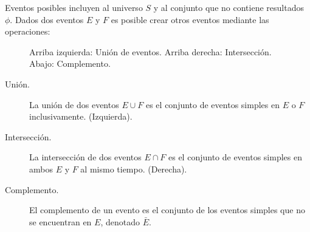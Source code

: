 Eventos posibles incluyen al universo $S$ y al conjunto que no contiene resultados $\phi$.  Dados dos eventos $E$ y $F$ es posible crear otros eventos mediante las operaciones:

\begin{figure}
  \centering
  \def\firstcircle{(0,0) circle (1.5cm)}
  \def\secondcircle{(0:2cm) circle (1.5cm)}
  \def\universesquare{(-2,-2) rectangle (4,2)}
  \def\universesmall{(-2,-2) rectangle (2,2)}
  
  \vspace{2mm}
  \caption{Arriba izquierda: Unión de eventos.  Arriba derecha: Intersección.  Abajo: Complemento.}\label{fig:creacionEventos}
\end{figure}

\begin{description}
 \item [Unión.] La unión de dos eventos $E \cup F$ es el conjunto de eventos simples en $E$ o $F$ inclusivamente.  (Izquierda).
 \item [Intersección.]  La intersección de dos eventos $E \cap F$ es el conjunto de eventos simples en ambos $E$ y $F$ al mismo tiempo.  (Derecha).
 \item [Complemento.] El complemento de un evento es el conjunto de los eventos simples que no se encuentran en $E$, denotado $\bar{E}$.
\end{description}



